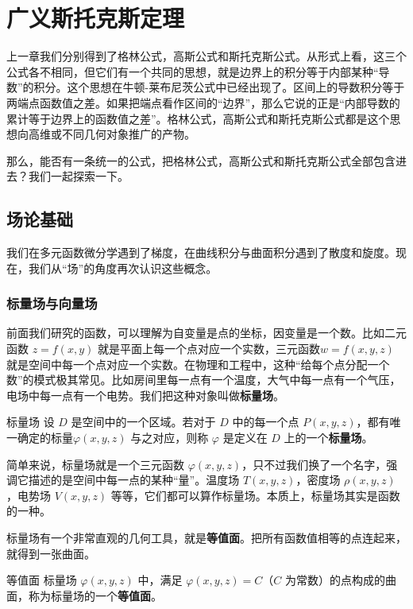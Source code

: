 \chapter{广义斯托克斯定理}
上一章我们分别得到了格林公式，高斯公式和斯托克斯公式。从形式上看，这三个公式各不相同，但它们有一个共同的思想，就是边界上的积分等于内部某种“导数”的积分。这个思想在牛顿-莱布尼茨公式中已经出现了。区间上的导数积分等于两端点函数值之差。如果把端点看作区间的“边界”，那么它说的正是“内部导数的累计等于边界上的函数值之差”。格林公式，高斯公式和斯托克斯公式都是这个思想向高维或不同几何对象推广的产物。

那么，能否有一条统一的公式，把格林公式，高斯公式和斯托克斯公式全部包含进去？我们一起探索一下。
\section{场论基础}
我们在多元函数微分学遇到了梯度，在曲线积分与曲面积分遇到了散度和旋度。现在，我们从“场”的角度再次认识这些概念。
\subsection{标量场与向量场}
前面我们研究的函数，可以理解为自变量是点的坐标，因变量是一个数。比如二元函数 $z = f(x, y)$ 就是平面上每一个点对应一个实数，三元函数$w = f(x, y, z)$ 就是空间中每一个点对应一个实数。在物理和工程中，这种“给每个点分配一个数”的模式极其常见。比如房间里每一点有一个温度，大气中每一点有一个气压，电场中每一点有一个电势。我们把这种对象叫做\textbf{标量场}。

\begin{definition}{标量场}{}
设 $D$ 是空间中的一个区域。若对于 $D$ 中的每一个点 $P(x, y, z)$，都有唯一确定的标量$\varphi(x, y, z)$ 与之对应，则称 $\varphi$ 是定义在 $D$ 上的一个\textbf{标量场}。
\end{definition}

简单来说，标量场就是一个三元函数 $\varphi(x, y, z)$，只不过我们换了一个名字，强调它描述的是空间中每一点的某种“量”。温度场 $T(x, y, z)$，密度场 $\rho(x, y, z)$，电势场 $V(x, y, z)$ 等等，它们都可以算作标量场。本质上，标量场其实是函数的一种。

标量场有一个非常直观的几何工具，就是\textbf{等值面}。把所有函数值相等的点连起来，就得到一张曲面。

\begin{definition}{等值面}{}
标量场 $\varphi(x, y, z)$ 中，满足 $\varphi(x, y, z) = C$（$C$ 为常数）的点构成的曲面，称为标量场的一个\textbf{等值面}。
\end{definition}

